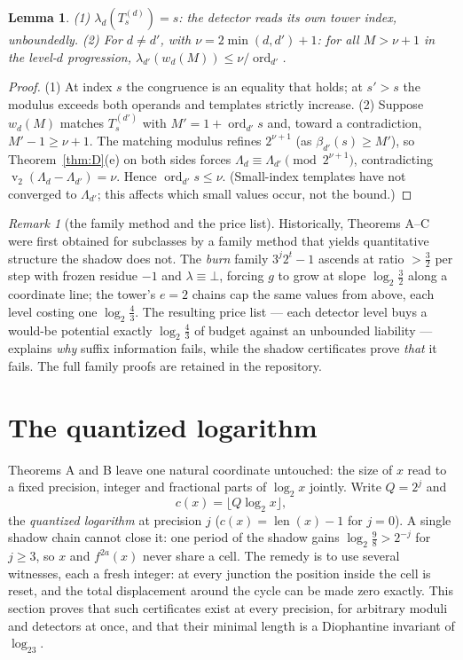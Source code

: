 \documentclass[11pt]{article}
\newtheorem{lemma}[theorem]{Lemma}
\theoremstyle{definition}
\theoremstyle{remark}
\newtheorem{remark}[theorem]{Remark}
\newcommand{\ord}{\operatorname{ord}}
\newcommand{\bitlen}{\operatorname{len}}
\DeclareMathOperator{\vv}{v}
\begin{document}
\begin{lemma}\label{lem:detfacts}
(1) $\lambda_d(T^{(d)}_s)=s$: the detector reads its own tower index,
unboundedly. (2) For $d\ne d'$, with $\nu=2\min(d,d')+1$: for all
$M>\nu+1$ in the level-$d$ progression,
$\lambda_{d'}(w_d(M))\le\nu/\ord_{d'}$.
\end{lemma}

\begin{proof}
(1) At index $s$ the congruence is an equality that holds; at $s'>s$
the modulus exceeds both operands and templates strictly increase.
(2) Suppose $w_d(M)$ matches $T^{(d')}_s$ with $M'=1+\ord_{d'}s$ and,
toward a contradiction, $M'-1\ge\nu+1$. The matching modulus refines
$2^{\nu+1}$ (as $\beta_{d'}(s)\ge M'$), so Theorem~\ref{thm:D}(e) on
both sides forces $\Lambda_d\equiv\Lambda_{d'}\pmod{2^{\nu+1}}$,
contradicting $\vv_2(\Lambda_d-\Lambda_{d'})=\nu$. Hence
$\ord_{d'}s\le\nu$. (Small-index templates have not converged to
$\Lambda_{d'}$; this affects which small values occur, not the bound.)
\end{proof}

\begin{remark}[the family method and the price list]\label{rem:price}
Historically, Theorems A--C were first obtained for subclasses by a
family method that yields quantitative structure the shadow does not.
The \emph{burn} family $3^{j}2^{t}-1$ ascends at ratio $>\tfrac32$ per
step with frozen residue $-1$ and $\lambda\equiv\bot$, forcing $g$ to
grow at slope $\log_2\tfrac32$ along a coordinate line; the tower's
$e{=}2$ chains cap the same values from above, each level costing one
$\log_2\tfrac43$. The resulting price list --- each detector level buys
a would-be potential exactly $\log_2\tfrac43$ of budget against an
unbounded liability --- explains \emph{why} suffix information fails,
while the shadow certificates prove \emph{that} it fails. The full
family proofs are retained in the repository.
\end{remark}

\section{The quantized logarithm}\label{sec:quantized}

Theorems A and B leave one natural coordinate untouched: the size of
$x$ read to a fixed precision, integer and fractional parts of
$\log_2x$ jointly. Write $Q=2^{j}$ and
\[
c(x)=\lfloor Q\log_2x\rfloor ,
\]
the \emph{quantized logarithm} at precision $j$ ($c(x)=\bitlen(x)-1$
for $j=0$). A single shadow chain cannot close it: one period of the
shadow gains $\log_2\tfrac98>2^{-j}$ for $j\ge3$, so $x$ and
$f^{2a}(x)$ never share a cell. The remedy is to use several witnesses,
each a fresh integer: at every junction the position inside the cell is
reset, and the total displacement around the cycle can be made zero
exactly. This section proves that such certificates exist at every
precision, for arbitrary moduli and detectors at once, and that their
minimal length is a Diophantine invariant of $\log_23$.
\end{document}

